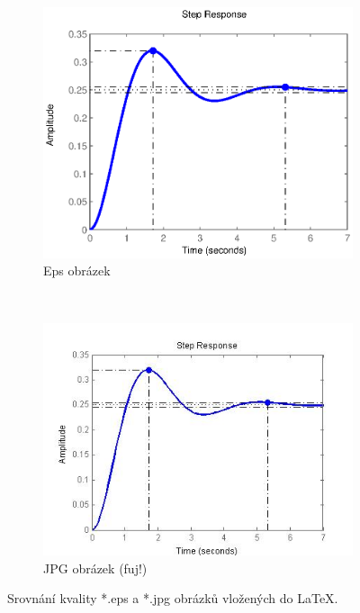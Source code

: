 \documentclass[twoside]{article}
\begin{document}
\begin{figure}[htb]
	\centering
	\begin{subfigure}[b]{0.45\textwidth}
		\includegraphics[width=\textwidth]{Figs/StepResponseEPS}
		\caption{Eps obrázek}
		\label{fig:EpsImg}
	\end{subfigure}%
	~ %
	\begin{subfigure}[b]{0.45\textwidth}
		\includegraphics[width=\textwidth]{Figs/StepResponseJPG}
		\caption{JPG obrázek (fuj!)}
		\label{fig:JpgImg}
	\end{subfigure}
	\caption{Srovnání kvality *.eps a *.jpg obrázků vložených do \LaTeX.}
	\label{fig:JpgEpsCompare}
\end{figure}
\end{document}
